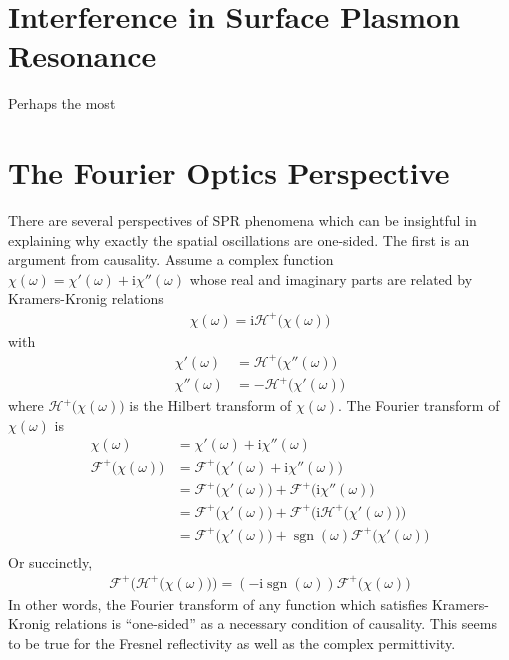 \documentclass[a4paper,titlepage,onecolumn]{report}
\DeclareMathOperator{\sgn}{sgn}
\newcommand{\mi}{{\mathrm{i}}}
\newcommand{\ff}[1]{{\mathscr{F}^{+}\bigl(#1\bigr)}}
\newcommand{\hf}[1]{{\mathscr{H}^{+}\bigl(#1\bigr)}}
\begin{document}
\section{Interference in Surface Plasmon Resonance}
Perhaps the most 

\section{The Fourier Optics Perspective}
There are several perspectives of SPR phenomena which can be insightful in
explaining why exactly the spatial oscillations are one-sided.  The first
is an argument from causality.  Assume a complex function $\chi(\omega) =
\chi'(\omega) + \mi \chi''(\omega)$ whose real and imaginary parts are
related by Kramers-Kronig relations
\begin{align}
\chi(\omega)=\mi \hf{\chi(\omega)}
\end{align}
with 
\begin{align}
\chi'(\omega) &= \hf{\chi''(\omega)}\\
\chi''(\omega) &= -\hf{\chi'(\omega)}
\end{align}
where $\hf{\chi(\omega)}$ is the Hilbert transform of $\chi(\omega)$.
The Fourier transform of $\chi(\omega)$ is
\begin{align}
\chi(\omega) &= \chi'(\omega) + \mi \chi''(\omega)\\
\ff{\chi(\omega)} &= \ff{\chi'(\omega) + \mi \chi''(\omega)}\\
&= \ff{\chi'(\omega)} + \ff{\mi \chi''(\omega)}\\
&= \ff{\chi'(\omega)} + \ff{\mi \hf{\chi'(\omega)}} \\
&= \ff{\chi'(\omega)} + \sgn(\omega) \ff{\chi'(\omega)} \\
\end{align}
Or succinctly,
\begin{align}
\ff{\hf{\chi(\omega)}} = (-\mi \sgn(\omega)) \ff{\chi(\omega)}
\end{align}
In other words, the Fourier transform of any function which satisfies
Kramers-Kronig relations is ``one-sided'' as a necessary
condition of causality.  This seems to be true for the Fresnel
reflectivity as well as the complex permittivity.
\end{document}
